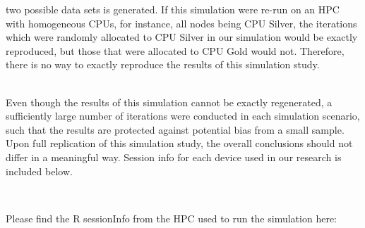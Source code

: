 \documentclass[
]{article}
\begin{document}
two possible data sets is generated. If this simulation were re-run on
an HPC with homogeneous CPUs, for instance, all nodes being CPU Silver,
the iterations which were randomly allocated to CPU Silver in our
simulation would be exactly reproduced, but those that were allocated to
CPU Gold would not. Therefore, there is no way to exactly reproduce the
results of this simulation study.\\
\strut \\
Even though the results of this simulation cannot be exactly
regenerated, a sufficiently large number of iterations were conducted in
each simulation scenario, such that the results are protected against
potential bias from a small sample. Upon full replication of this
simulation study, the overall conclusions should not differ in a
meaningful way. Session info for each device used in our research is
included below.\\
\strut \\

\newpage

Please find the R sessionInfo from the HPC used to run the simulation
here:\\
\footnotesize
\end{document}
